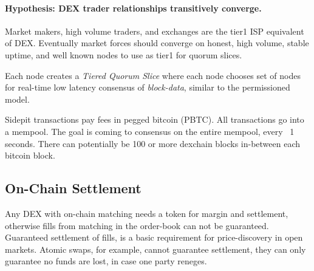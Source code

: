 \documentclass[12pt]{article}
\begin{document}
\paragraph{Hypothesis: DEX trader relationships transitively converge.} Market makers, high volume traders, and exchanges are the tier1 ISP equivalent of DEX. Eventually market forces should converge on honest, high volume, stable uptime, and well known nodes to use as tier1 for quorum slices.

Each node creates a \emph{Tiered Quorum Slice} where each node chooses set of nodes for real-time low latency consensus of \emph{block-data}, similar to the permissioned model. 


Sidepit transactions pay fees in pegged bitcoin (PBTC). All transactions go into a mempool. The goal is coming to consensus on the entire mempool, every ~1 seconds. There can potentially be 100 or more dexchain blocks in-between each bitcoin block.

\subsection*{On-Chain Settlement}
Any DEX with on-chain matching needs a token for margin and settlement, otherwise fills from matching in the order-book can not be guaranteed. Guaranteed settlement of fills, is a basic requirement for price-discovery in open markets. Atomic swaps, for example, cannot guarantee settlement, they can only guarantee no funds are lost, in case one party reneges.
 
\newpage
{}
% 

\end{document}
